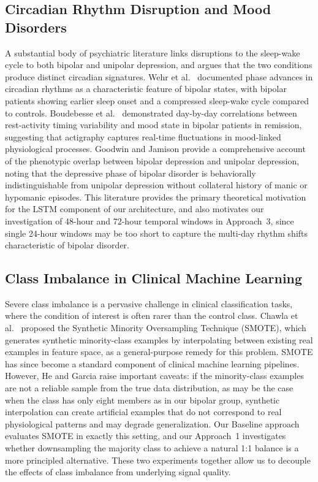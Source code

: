 \subsection{Circadian Rhythm Disruption and Mood Disorders}

A substantial body of psychiatric literature links disruptions to the sleep-wake cycle to both bipolar and unipolar depression, and argues that the two conditions produce distinct circadian signatures. Wehr et al.\ \cite{wehr1987sleep} documented phase advances in circadian rhythms as a characteristic feature of bipolar states, with bipolar patients showing earlier sleep onset and a compressed sleep-wake cycle compared to controls. Boudebesse et al.\ \cite{boudebesse2014sleep} demonstrated day-by-day correlations between rest-activity timing variability and mood state in bipolar patients in remission, suggesting that actigraphy captures real-time fluctuations in mood-linked physiological processes. Goodwin and Jamison \cite{goodwin2007manic} provide a comprehensive account of the phenotypic overlap between bipolar depression and unipolar depression, noting that the depressive phase of bipolar disorder is behaviorally indistinguishable from unipolar depression without collateral history of manic or hypomanic episodes. This literature provides the primary theoretical motivation for the LSTM component of our architecture, and also motivates our investigation of 48-hour and 72-hour temporal windows in Approach~3, since single 24-hour windows may be too short to capture the multi-day rhythm shifts characteristic of bipolar disorder.

\subsection{Class Imbalance in Clinical Machine Learning}

Severe class imbalance is a pervasive challenge in clinical classification tasks, where the condition of interest is often rarer than the control class. Chawla et al.\ \cite{chawla2002smote} proposed the Synthetic Minority Oversampling Technique (SMOTE), which generates synthetic minority-class examples by interpolating between existing real examples in feature space, as a general-purpose remedy for this problem. SMOTE has since become a standard component of clinical machine learning pipelines. However, He and Garcia \cite{he2009learning} raise important caveats: if the minority-class examples are not a reliable sample from the true data distribution, as may be the case when the class has only eight members as in our bipolar group, synthetic interpolation can create artificial examples that do not correspond to real physiological patterns and may degrade generalization. Our Baseline approach evaluates SMOTE in exactly this setting, and our Approach~1 investigates whether downsampling the majority class to achieve a natural 1:1 balance is a more principled alternative. These two experiments together allow us to decouple the effects of class imbalance from underlying signal quality.
